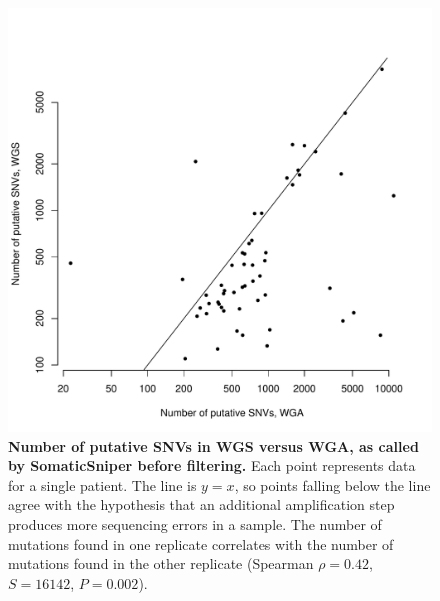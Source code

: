 \documentclass[11 pt]{article} %
\begin{document}
\begin{figure}
\centerline{
\includegraphics[width=5in]{Figure2.pdf} }
\caption{\textbf{Number of putative SNVs in WGS versus WGA, as called by SomaticSniper before filtering.} Each point represents data for a single patient. The line is $y=x$, so points falling below the line agree with the hypothesis that an additional amplification step produces more sequencing errors in a sample. The number of mutations found in one replicate correlates with the number of mutations found in the other replicate (Spearman $\rho=0.42$, $S=16142$, $P=0.002$).}
\label{fig:C282_v_C484}
\end{figure}
\end{document}
